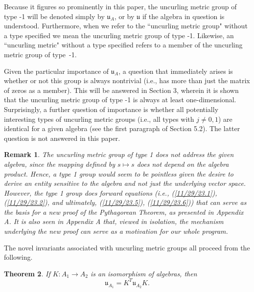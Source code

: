 \documentclass{amsart}
\numberwithin{equation}{section}
\newtheorem{theorem}{Theorem}
\newtheorem{remark}[theorem]{Remark}
\theoremstyle{definition}
\numberwithin{theorem}{section}
\begin{document}
   
Because it figures so prominently in this paper, the uncurling metric group of type -1 will be denoted simply by $\mathfrak{u}_A$, or by $\mathfrak{u}$ if the algebra in question is understood.  Furthermore, when we refer to the ``uncurling metric group" without a type specified we mean the uncurling metric group of type -1.  Likewise, an ``uncurling metric" without a type specified refers to a member of the uncurling metric group of \mbox{type -1}. 
 
      Given the particular importance of $\mathfrak{u}_A$, a question that immediately arises is whether or not this group is always nontrivial (i.e., has more than just the matrix of zeros as a member).  This will be answered in Section 3, wherein it is shown that the uncurling metric group of type -1 is always at least one-dimensional.  Surprisingly, a further question of importance is whether all potentially interesting types of uncurling metric groups (i.e., all types with $j\ne 0,1$) are identical for a given algebra (see the first paragraph of Section 5.2).  The latter question is not answered in this paper.

\begin{remark}\label{11/21/23.1} {\rm The uncurling metric group of type 1 does not address the given algebra, since the mapping defined by $s\mapsto s$ does not depend on the algebra product.  Hence, a type 1 group would seem to be pointless given the desire to derive an entity sensitive to the algebra and not just the underlying vector space.  However, the type 1 group does forward equations (i.e., (\ref{11/29/23.1}), (\ref{11/29/23.2}), and ultimately, (\ref{11/29/23.5}), (\ref{11/29/23.6})) that can serve as the basis for a new proof of the Pythagorean Theorem, as presented in Appendix A.  It is also seen in Appendix A that, viewed in isolation, the mechanism underlying the new proof can serve as a motivation for our whole program.}\end{remark}

\enlargethispage{1cm}

The novel invariants associated with uncurling metric groups all proceed from the following.


\begin{theorem} \label{6/6/23.1} If $K:A_1\rightarrow A_2$ is an isomorphism of algebras, then \begin{equation}\label{5/23/23.1} \mathfrak{u}_{A_1} = K^T \mathfrak{u}_{A_2} K. \end{equation} \end{theorem}
\end{document}
